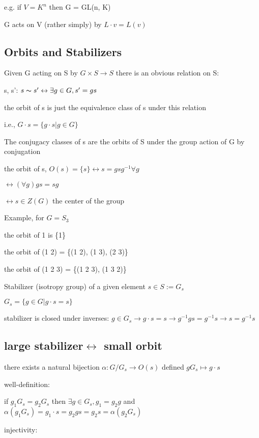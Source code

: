\documentclass[12pt]{article}
\begin{document}
e.g. if $V = K^n$ then G = GL(n, K)

G acts on V (rather simply) by $L \cdot v = L(v)$

\subsection{Orbits and Stabilizers}

\noindent
Given G acting on S by $G \times S \to S$ there is an obvious relation on S:

s, s': $s \thicksim s' \leftrightarrow \exists g \in G, s' = gs $

the orbit of s is just the equivalence class of s under this relation

i.e., $G \cdot s = \{g \cdot s | g \in G\}$

\noindent
The conjugacy classes of s are the orbits of S under the group action of G by conjugation

the orbit of s, $O(s) = \{s\} \leftrightarrow s = gsg^{-1} \forall g$

$\leftrightarrow (\forall g)gs = sg$

$\leftrightarrow s \in Z(G)$ the center of the group

\noindent
Example, for $G = S_3$

the orbit of 1 is \{1\}

the orbit of (1 2) = \{(1 2), (1 3), (2 3)\}

the orbit of (1 2 3) = \{(1 2 3), (1 3 2)\}

\noindent
Stabilizer (isotropy group) of a given element $s \in S := G_s$

$G_s = \{g \in G |g \cdot s = s\}$

stabilizer is closed under inverses: $g \in G_s \to g \cdot s = s \to g^{-1}gs = g^{-1}s \to s = g^{-1}s$

\subsection{large stabilizer$\leftrightarrow$ small orbit}

\noindent
there exists a natural bijection $\alpha: G/G_s \to O(s)$ defined $gG_s \mapsto g \cdot s$


\noindent
well-definition:

if $g_1G_s = g_2G_s$
then $\exists g \in G_s, g_1 = g_2g$
and $\alpha(g_1G_s) = g_1 \cdot s = g_2 g s = g_2 s = \alpha(g_2G_s)$

\noindent
injectivity:
\end{document}
